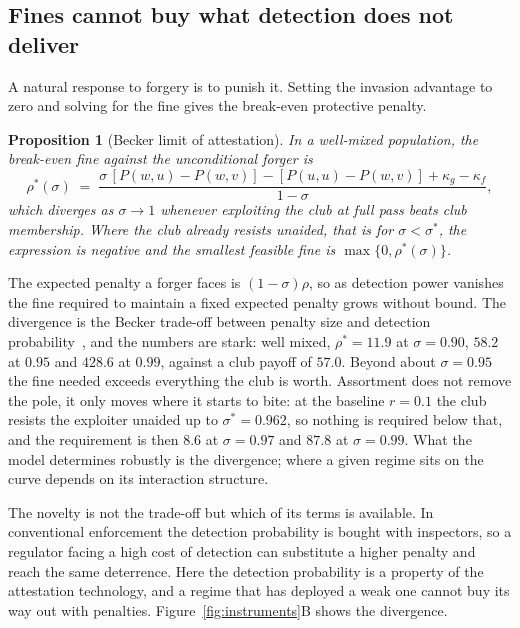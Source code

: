 \documentclass[preprint,12pt]{elsarticle}
\theoremstyle{plain}
\newtheorem{proposition}[theorem]{Proposition}
\theoremstyle{definition}
\begin{document}
\subsection{Fines cannot buy what detection does not deliver}
\label{sec:fines}

A natural response to forgery is to punish it. Setting the invasion advantage
to zero and solving for the fine gives the break-even protective penalty.

\begin{proposition}[Becker limit of attestation]
\label{prop:fines}
In a well-mixed population, the break-even fine against the unconditional
forger is
\begin{equation}
\label{eq:rhostar}
\rho^{*}(\sigma) \;=\;
  \frac{\sigma\,[P(w,u) - P(w,v)] - [P(u,u) - P(w,v)] + \kappa_g - \kappa_f}
       {1 - \sigma},
\end{equation}
which diverges as $\sigma \to 1$ whenever exploiting the club at full pass
beats club membership. Where the club already resists unaided, that is for
$\sigma < \sigma^{*}$, the expression is negative and the smallest feasible
fine is $\max\{0,\rho^{*}(\sigma)\}$.
\end{proposition}

The expected penalty a forger faces is $(1 - \sigma)\rho$, so as detection power
vanishes the fine required to maintain a fixed expected penalty grows without
bound. The divergence is the Becker trade-off between penalty size and
detection probability~\citep{becker1968crime,polinsky2000economic}, and the
numbers are stark: well mixed, $\rho^{*} = 11.9$ at $\sigma = 0.90$, $58.2$ at
$0.95$ and $428.6$ at $0.99$, against a club payoff of $57.0$. Beyond about
$\sigma = 0.95$ the fine needed exceeds everything the club is worth. Assortment
does not remove the pole, it only moves where it starts to bite: at the
baseline $r = 0.1$ the club resists the exploiter unaided up to
$\sigma^{*} = 0.962$, so nothing is required below that, and the requirement is
then $8.6$ at $\sigma = 0.97$ and $87.8$ at $\sigma = 0.99$. What the model
determines robustly is the divergence; where a given regime sits on the curve
depends on its interaction structure.

The novelty is not the trade-off but which of its terms is available. In
conventional enforcement the detection probability is bought with inspectors,
so a regulator facing a high cost of detection can substitute a higher penalty
and reach the same deterrence. Here the detection probability is a property of
the attestation technology, and a regime that has deployed a weak one cannot
buy its way out with penalties. Figure~\ref{fig:instruments}B shows the
divergence.
\end{document}
